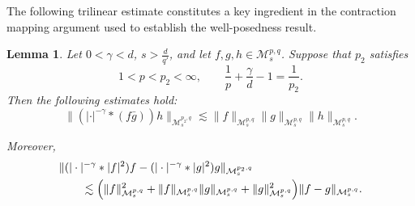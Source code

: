\documentclass[12pt,reqno,a4paper]{amsart}
\numberwithin{equation}{section}
\theoremstyle{plain}
\newtheorem{lemma}[theorem]{Lemma}
\theoremstyle{definition}
\theoremstyle{remark}
\def\M{\mathcal{M}}
\def \M{{\mathcal M}}
\begin{document}
The following trilinear estimate constitutes a key ingredient in the contraction mapping argument used to establish the well-posedness result.
\begin{lemma}
\label{trlnrlma}
Let \(0<\gamma<d\), \(s>\frac{d}{q'}\), and let \(f,g,h\in \M^{p,q}_{s}\). Suppose that \(p_{2}\) satisfies
\[
1<p<p_{2}<\infty,
\qquad
\frac{1}{p}+\frac{\gamma}{d}-1=\frac{1}{p_{2}}.
\]
Then the following estimates hold:
\begin{equation}
\label{trlnr11}
\|(|\cdot|^{-\gamma}*(f\bar{g}))h\|_{\M^{p_{2},q}_{s}}
\lesssim
\|f\|_{\M^{p,q}_{s}}
\|g\|_{\M^{p,q}_{s}}
\|h\|_{\M^{p,q}_{s}}.
\end{equation}

Moreover,
\begin{align}
\label{trlnr2}
&\|(|\cdot|^{-\gamma}*|f|^{2})f-(|\cdot|^{-\gamma}*|g|^{2})g\|_{\M^{p_{2},q}_{s}}
\nonumber\\
&\qquad\lesssim
\Bigl(
\|f\|^{2}_{\M^{p,q}_{s}}
+
\|f\|_{\M^{p,q}_{s}}
\|g\|_{\M^{p,q}_{s}}
+
\|g\|^{2}_{\M^{p,q}_{s}}
\Bigr)
\|f-g\|_{\M^{p,q}_{s}}.
\end{align}
\end{lemma}
\end{document}
